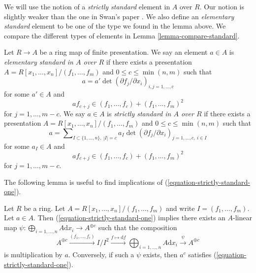 \noindent
We will use the notion of a {\it strictly standard} element in
$A$ over $R$. Our notion is slightly weaker than the
one in Swan's paper \cite{swan}. We also define an {\it elementary
standard} element to be one of the type we found in the lemma above.
We compare the different types of elements in
Lemma \ref{lemma-compare-standard}.

\begin{definition}
\label{definition-strictly-standard}
Let $R \to A$ be a ring map of finite presentation.
We say an element $a \in A$ is {\it elementary standard in $A$ over $R$}
if there exists a presentation
$A = R[x_1, \ldots, x_n]/(f_1, \ldots, f_m)$
and $0 \leq c \leq \min(n, m)$ such that
\begin{equation}
\label{equation-elementary-standard-one}
a = a' \det(\partial f_j/\partial x_i)_{i, j = 1, \ldots, c}
\end{equation}
for some $a' \in A$ and
\begin{equation}
\label{equation-elementary-standard-two}
a f_{c + j} \in (f_1, \ldots, f_c) + (f_1, \ldots, f_m)^2
\end{equation}
for $j = 1, \ldots, m - c$. We say $a \in A$ is
{\it strictly standard in $A$ over $R$} if there exists a presentation
$A = R[x_1, \ldots, x_n]/(f_1, \ldots, f_m)$
and $0 \leq c \leq \min(n, m)$ such that
\begin{equation}
\label{equation-strictly-standard-one}
a = \sum\nolimits_{I \subset \{1, \ldots, n\},\ |I| = c}
a_I \det(\partial f_j/\partial x_i)_{j = 1, \ldots, c,\ i \in I}
\end{equation}
for some $a_I \in A$ and
\begin{equation}
\label{equation-strictly-standard-two}
a f_{c + j} \in (f_1, \ldots, f_c) + (f_1, \ldots, f_m)^2
\end{equation}
for $j = 1, \ldots, m - c$.
\end{definition}

\noindent
The following lemma is useful to find implications of
(\ref{equation-strictly-standard-one}).

\begin{lemma}
\label{lemma-parse-equation-strictly-standard-one}
Let $R$ be a ring. Let $A = R[x_1, \ldots, x_n]/(f_1, \ldots, f_m)$
and write $I = (f_1, \ldots, f_m)$. Let $a \in A$. Then
(\ref{equation-strictly-standard-one}) implies
there exists an $A$-linear map
$\psi : \bigoplus\nolimits_{i = 1, \ldots, n} A \text{d}x_i \to A^{\oplus c}$
such that the composition
$$
A^{\oplus c} \xrightarrow{(f_1, \ldots, f_c)}
I/I^2 \xrightarrow{f \mapsto \text{d}f}
\bigoplus\nolimits_{i = 1, \ldots, n} A \text{d}x_i
\xrightarrow{\psi}
A^{\oplus c}
$$
is multiplication by $a$. Conversely, if such a $\psi$ exists, then
$a^c$ satisfies (\ref{equation-strictly-standard-one}).
\end{lemma}

